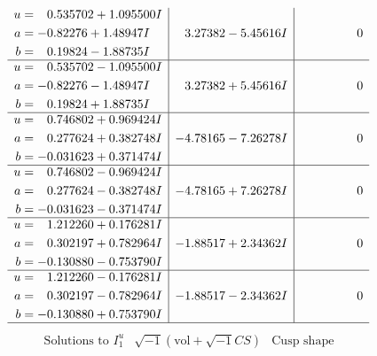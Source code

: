 \documentclass[1p]{elsarticle_modified}
\theoremstyle{definition}
\newcommand{\I}{\sqrt{-1}}
\begin{document}
$$\begin{array}{c|c|c}
\begin{aligned}
u &= \phantom{-}0.535702 + 1.095500 I \\
a &= -0.82276 + 1.48947 I \\
b &= \phantom{-}0.19824 - 1.88735 I\end{aligned}
 & \phantom{-}3.27382 - 5.45616 I & \phantom{-0.000000 } 0 \\ \hline\begin{aligned}
u &= \phantom{-}0.535702 - 1.095500 I \\
a &= -0.82276 - 1.48947 I \\
b &= \phantom{-}0.19824 + 1.88735 I\end{aligned}
 & \phantom{-}3.27382 + 5.45616 I & \phantom{-0.000000 } 0 \\ \hline\begin{aligned}
u &= \phantom{-}0.746802 + 0.969424 I \\
a &= \phantom{-}0.277624 + 0.382748 I \\
b &= -0.031623 + 0.371474 I\end{aligned}
 & -4.78165 - 7.26278 I & \phantom{-0.000000 } 0 \\ \hline\begin{aligned}
u &= \phantom{-}0.746802 - 0.969424 I \\
a &= \phantom{-}0.277624 - 0.382748 I \\
b &= -0.031623 - 0.371474 I\end{aligned}
 & -4.78165 + 7.26278 I & \phantom{-0.000000 } 0 \\ \hline\begin{aligned}
u &= \phantom{-}1.212260 + 0.176281 I \\
a &= \phantom{-}0.302197 + 0.782964 I \\
b &= -0.130880 - 0.753790 I\end{aligned}
 & -1.88517 + 2.34362 I & \phantom{-0.000000 } 0 \\ \hline\begin{aligned}
u &= \phantom{-}1.212260 - 0.176281 I \\
a &= \phantom{-}0.302197 - 0.782964 I \\
b &= -0.130880 + 0.753790 I\end{aligned}
 & -1.88517 - 2.34362 I & \phantom{-0.000000 } 0\\
 \hline 
 \end{array}$$\newpage$$\begin{array}{c|c|c}  
\text{Solutions to }I^u_{1}& \I (\text{vol} + \sqrt{-1}CS) & \text{Cusp shape}\\
 \hline 
\begin{aligned}

\end{aligned}
\end{array}$$
\end{document}
